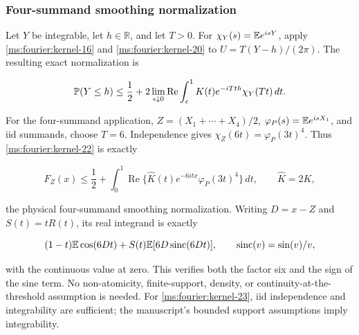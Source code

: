 \subsubsection{Four-summand smoothing normalization}

Let \(Y\) be integrable, let \(h\in\mathbb R\), and let \(T>0\). For
\(\chi_Y(s)=\mathbb E e^{isY}\), apply \eqref{ms:fourier:kernel-16} and \eqref{ms:fourier:kernel-20} to
\(U=T(Y-h)/(2\pi)\). The resulting exact normalization is

\begin{equation}
 \mathbb P(Y\le h)\le\frac12+
  2\lim_{\epsilon\downarrow0}\operatorname{Re}
       \int_\epsilon^1K(t)e^{-iTth}\chi_Y(Tt)\,dt.
 \label{ms:fourier:kernel-22}
\end{equation}

For the four-summand application,
\(Z=(X_1+\cdots+X_4)/2\), \(\varphi_P(s)=\mathbb E e^{isX_1}\),
and iid summands, choose \(T=6\). Independence gives
\(\chi_Z(6t)=\varphi_P(3t)^4\). Thus \eqref{ms:fourier:kernel-22} is exactly

\begin{equation}
 F_Z(x)\le\frac12+\int_0^1\operatorname{Re}
   \{\widehat K(t)e^{-6itx}\varphi_P(3t)^4\}\,dt,
 \qquad \widehat K=2K,
 \label{ms:fourier:kernel-23}
\end{equation}

the physical four-summand smoothing normalization. Writing \(D=x-Z\) and
\(S(t)=tR(t)\), its real integrand is exactly

\begin{equation}
 (1-t)\mathbb E\cos(6Dt)+S(t)\mathbb E[6D\operatorname{sinc}(6Dt)],
 \qquad \operatorname{sinc}(v)=\sin(v)/v,
 \label{ms:fourier:kernel-24}
\end{equation}

with the continuous value at zero. This verifies both the factor six
and the sign of the sine term. No non-atomicity, finite-support, density,
or continuity-at-the-threshold assumption is needed. For \eqref{ms:fourier:kernel-23}, iid
independence and integrability are sufficient; the manuscript's bounded
support assumptions imply integrability.

